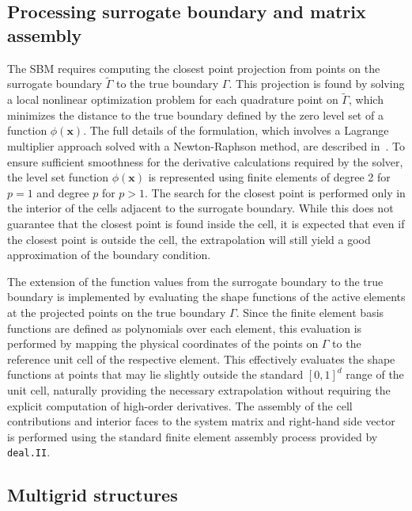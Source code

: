 \documentclass{elsarticle}
\begin{document}
\subsection{Processing surrogate boundary and matrix assembly}
\label{sec:sbm_assembly}
The SBM requires computing the closest point projection from points on the surrogate boundary $\tilde{\Gamma}$ to the
true boundary $\Gamma$. This projection is found by solving a local nonlinear optimization problem for each quadrature
point on $\tilde{\Gamma}$, which minimizes the distance to the true boundary defined by the zero level set of a
function $\phi(\mathbf{x})$. The full details of the formulation, which involves a Lagrange multiplier approach solved
with a Newton-Raphson method, are described in~\cite{wichrowski2025geometric}. To ensure sufficient
smoothness for the derivative calculations required by the solver, the level set function $\phi(\mathbf{x})$ is
represented using finite elements of degree 2 for $p=1$ and degree $p$ for $p>1$. The search for the closest point is
performed only in the interior of the cells adjacent to the surrogate
boundary. While this does not guarantee that the closest point is found inside the cell, it is expected that
even if the closest point is outside the cell, the extrapolation will still yield a good approximation of the boundary
condition.

The extension of the function values from the surrogate boundary to the true boundary is implemented by evaluating the
shape functions of the active elements at the projected points on the true boundary $\Gamma$. Since the finite element
basis functions are defined as polynomials over each element, this evaluation is performed by mapping the physical
coordinates of the points on $\Gamma$ to the reference unit cell of the respective element. This effectively evaluates
the shape functions at points that may lie slightly outside the standard $[0,1]^d$ range of the unit cell, naturally
providing the necessary extrapolation without requiring the explicit computation of high-order derivatives. The
assembly of the cell contributions and interior faces to the system matrix and right-hand side vector is performed
using the standard finite element assembly process provided by \texttt{deal.II}.

\subsection{Multigrid structures}
\end{document}
